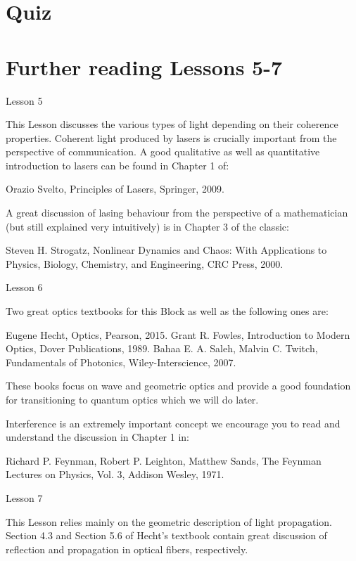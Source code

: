 \newpage
\section*{Quiz}

\section*{Further reading Lessons 5-7}

Lesson 5

This Lesson discusses the various types of light depending on their coherence properties. Coherent light produced by lasers is crucially important from the perspective of communication. A good qualitative as well as quantitative introduction to lasers can be found in Chapter 1 of:

Orazio Svelto, Principles of Lasers, Springer, 2009.

A great discussion of lasing behaviour from the perspective of a mathematician (but still explained very intuitively) is in Chapter 3 of the classic:

Steven H. Strogatz, Nonlinear Dynamics and Chaos: With Applications to Physics, Biology, Chemistry, and Engineering, CRC Press, 2000.

Lesson 6

Two great optics textbooks for this Block as well as the following ones are:

Eugene Hecht, Optics, Pearson, 2015.
Grant R. Fowles, Introduction to Modern Optics, Dover Publications, 1989.
Bahaa E. A. Saleh, Malvin C. Twitch, Fundamentals of Photonics, Wiley-Interscience, 2007.

These books focus on wave and geometric optics and provide a good foundation for transitioning to quantum optics which we will do later.

Interference is an extremely important concept we encourage you to read and understand the discussion in Chapter 1 in:

Richard P. Feynman, Robert P. Leighton, Matthew Sands, The Feynman Lectures on Physics, Vol. 3, Addison Wesley, 1971.

Lesson 7

This Lesson relies mainly on the geometric description of light propagation. Section 4.3 and Section 5.6 of Hecht’s textbook contain great discussion of reflection and propagation in optical fibers, respectively.
